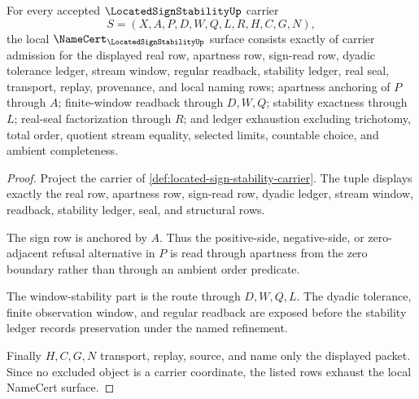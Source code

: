 \begin{theorem}
\label{thm:located-sign-stability-namecert-obligations}
For every accepted $\LocatedSignStabilityUp$ carrier
$$
S=(X,A,P,D,W,Q,L,R,H,C,G,N),
$$
the local $\NameCert_{\LocatedSignStabilityUp}$ surface consists exactly of carrier admission for the displayed real row, apartness row, sign-read row, dyadic tolerance ledger, stream window, regular readback, stability ledger, real seal, transport, replay, provenance, and local naming rows; apartness anchoring of $P$ through $A$; finite-window readback through $D,W,Q$; stability exactness through $L$; real-seal factorization through $R$; and ledger exhaustion excluding trichotomy, total order, quotient stream equality, selected limits, countable choice, and ambient completeness.
\end{theorem}
\begin{proof}
Project the carrier of \autoref{def:located-sign-stability-carrier}. The tuple displays exactly the real row, apartness row, sign-read row, dyadic ledger, stream window, readback, stability ledger, seal, and structural rows.

The sign row is anchored by $A$. Thus the positive-side, negative-side, or zero-adjacent refusal alternative in $P$ is read through apartness from the zero boundary rather than through an ambient order predicate.

The window-stability part is the route through $D,W,Q,L$. The dyadic tolerance, finite observation window, and regular readback are exposed before the stability ledger records preservation under the named refinement.

Finally $H,C,G,N$ transport, replay, source, and name only the displayed packet. Since no excluded object is a carrier coordinate, the listed rows exhaust the local NameCert surface.
\end{proof}

